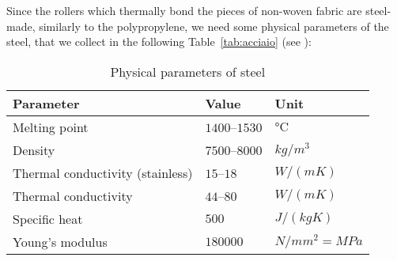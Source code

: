Since the rollers which thermally bond the pieces of non-woven fabric are steel-made, similarly to the polypropylene, we need some physical parameters of the steel, that we collect in the following Table~\ref{tab:acciaio} (see \cite{steel3, steel4, steel2, steel1}):

\begin{table}[H]
  \caption{Physical parameters of steel}\label{tab:acciaio}
  \label{tab:steel}
  \begin{center}
  \begin{tabular}{lll}
    Parameter     & Value & Unit \\
    \hline
    Melting point               & $1400$--$1530$ & $\unit{\celsius}$                   \\
    Density                     & $7500$--$8000$ & $\unit{kg}/\unit{m}^3$   \\
    Thermal conductivity (stainless) & $15$--$18$     & $\unit{W}/(\unit{m K})$  \\
    Thermal conductivity        & $44$--$80$     & $\unit{W}/(\unit{m K})$  \\
    Specific heat               & $500$          & $\unit{J}/(\unit{kg K})$ \\
    Young's modulus              & $180000$       & $\unit{N}/\unit{mm}^2=\unit{MPa}$ \\
    \hline
  \end{tabular}
  \end{center}
\end{table}



